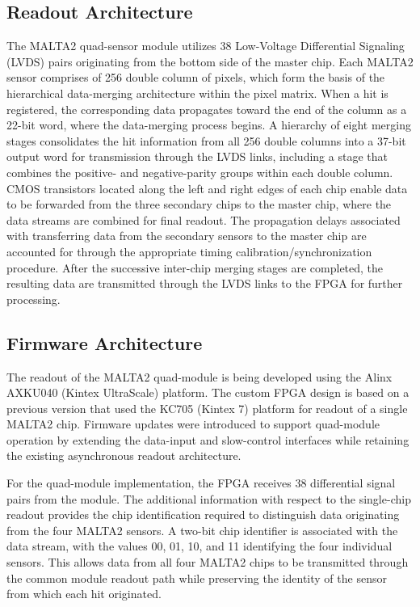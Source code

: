 \documentclass[pdftex,twocolumn,epjc3]{svjour3}          %
\begin{document}
\subsection{Readout Architecture}
The MALTA2 quad-sensor module utilizes 38 Low-Voltage Differential Signaling (LVDS) pairs originating from the bottom side of the master chip. Each MALTA2 sensor comprises of 256 double column of pixels, which form the basis of the hierarchical data-merging architecture within the pixel matrix. When a hit is registered, the corresponding data propagates toward the end of the column as a 22-bit word, where the data-merging process begins. A hierarchy of eight merging stages consolidates the hit information from all 256 double columns into a 37-bit output word for transmission through the LVDS links, including a stage that combines the positive- and negative-parity groups within each double column. CMOS transistors located along the left and right edges of each chip enable data to be forwarded from the three secondary chips to the master chip, where the data streams are combined for final readout. The propagation delays associated with transferring data from the secondary sensors to the master chip are accounted for through the appropriate timing calibration/synchronization procedure. After the successive inter-chip merging stages are completed, the resulting data are transmitted through the LVDS links to the FPGA for further processing.

\subsection{Firmware Architecture}
The readout of the MALTA2 quad-module is being developed using the Alinx AXKU040 (Kintex UltraScale) platform. The custom FPGA design is based on a previous version that used the KC705 (Kintex 7) platform for readout of a single MALTA2 chip. 
%
Firmware updates were introduced to support quad-module operation by extending the data-input and slow-control interfaces while retaining the existing asynchronous readout architecture.

 
%
For the quad-module implementation, the FPGA receives 38 differential signal pairs from the module. The additional information with respect to the single-chip readout provides the chip identification required to distinguish data originating from the four MALTA2 sensors. A two-bit chip identifier is associated with the data stream, with the values 00, 01, 10, and 11 identifying the four individual sensors. This allows data from all four MALTA2 chips to be transmitted through the common module readout path while preserving the identity of the sensor from which each hit originated.
\end{document}
